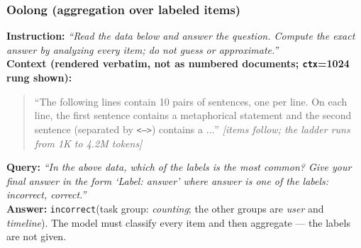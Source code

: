 \subsubsection{Oolong (aggregation over labeled items)}

\textbf{Instruction:} \emph{``Read the data below and answer the question. Compute the exact answer by
analyzing every item; do not guess or approximate.''}\\
\textbf{Context (rendered verbatim, not as numbered documents; \texttt{ctx}=1024 rung shown):}
\begin{quote}\small
``The following lines contain 10 pairs of sentences, one per line. On each line, the first sentence
contains a metaphorical statement and the second sentence (separated by \texttt{<-->}) contains a
$\dots$'' \emph{[items follow; the ladder runs from 1K to 4.2M tokens]}
\end{quote}
\textbf{Query:} \emph{``In the above data, which of the labels is the most common? Give your final
answer in the form `Label: answer' where answer is one of the labels: incorrect, correct.''}\\
\textbf{Answer:} \texttt{incorrect}\quad(task group: \emph{counting}; the other groups are
\emph{user} and \emph{timeline}). The model must classify every item and then aggregate --- the
labels are not given.

